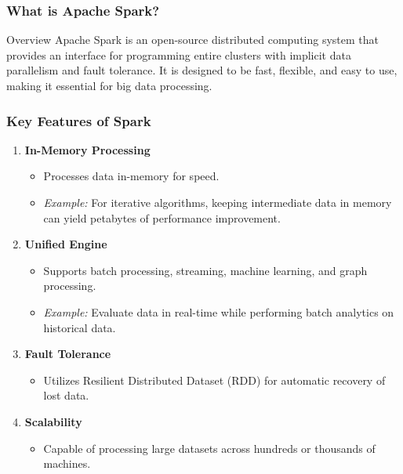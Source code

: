\documentclass[aspectratio=169]{beamer}
\begin{document}
\frame{\titlepage}

\begin{frame}[fragile]
  \titlepage
\end{frame}

\begin{frame}[fragile]
  \frametitle{What is Apache Spark?}
  \begin{block}{Overview}
    Apache Spark is an open-source distributed computing system that provides an interface for programming entire clusters with implicit data parallelism and fault tolerance. It is designed to be fast, flexible, and easy to use, making it essential for big data processing.
  \end{block}
\end{frame}

\begin{frame}[fragile]
  \frametitle{Key Features of Spark}
  \begin{enumerate}
    \item \textbf{In-Memory Processing}
      \begin{itemize}
        \item Processes data in-memory for speed.
        \item \textit{Example:} For iterative algorithms, keeping intermediate data in memory can yield petabytes of performance improvement.
      \end{itemize}
      
    \item \textbf{Unified Engine}
      \begin{itemize}
        \item Supports batch processing, streaming, machine learning, and graph processing.
        \item \textit{Example:} Evaluate data in real-time while performing batch analytics on historical data.
      \end{itemize}

    \item \textbf{Fault Tolerance}
      \begin{itemize}
        \item Utilizes Resilient Distributed Dataset (RDD) for automatic recovery of lost data.
      \end{itemize}

    \item \textbf{Scalability}
      \begin{itemize}
        \item Capable of processing large datasets across hundreds or thousands of machines.
      \end{itemize}
  \end{enumerate}
\end{frame}
\end{document}
